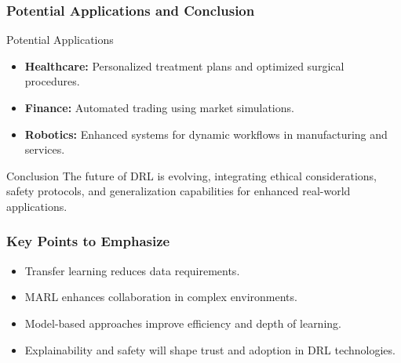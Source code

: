 \documentclass[aspectratio=169]{beamer}
\begin{document}
\begin{frame}[fragile]
    \frametitle{Potential Applications and Conclusion}
    \begin{block}{Potential Applications}
        \begin{itemize}
            \item \textbf{Healthcare:} Personalized treatment plans and optimized surgical procedures.
            \item \textbf{Finance:} Automated trading using market simulations.
            \item \textbf{Robotics:} Enhanced systems for dynamic workflows in manufacturing and services.
        \end{itemize}
    \end{block}
    
    \begin{block}{Conclusion}
        The future of DRL is evolving, integrating ethical considerations, safety protocols, and generalization capabilities for enhanced real-world applications.
    \end{block}
\end{frame}

\begin{frame}
    \frametitle{Key Points to Emphasize}
    \begin{itemize}
        \item Transfer learning reduces data requirements.
        \item MARL enhances collaboration in complex environments.
        \item Model-based approaches improve efficiency and depth of learning.
        \item Explainability and safety will shape trust and adoption in DRL technologies.
    \end{itemize}
\end{frame}
\end{document}
